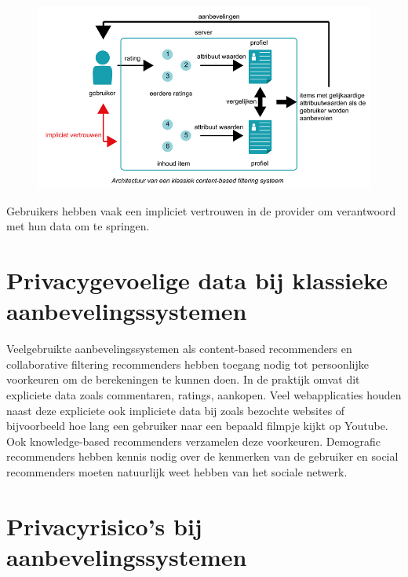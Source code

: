 \begin{figure}[htpb]   
    \label{Figuur::randomisatie}      
  \begin{center}    
 \includegraphics[scale=0.5]{fig/klassiek_systeem}    
  \end{center}   
   
   \end{figure}
Gebruikers hebben vaak een impliciet vertrouwen in de provider om verantwoord met hun data om te springen. 
\pagebreak
\section{Privacygevoelige data bij klassieke aanbevelingssystemen}
Veelgebruikte aanbevelingssystemen als content-based recommenders en collaborative filtering recommenders hebben toegang nodig tot persoonlijke voorkeuren om de berekeningen te kunnen doen. In de praktijk omvat dit expliciete data zoals commentaren, ratings, aankopen. Veel webapplicaties houden naast deze expliciete ook impliciete data bij zoals bezochte websites of bijvoorbeeld hoe lang een gebruiker naar een bepaald filmpje kijkt op Youtube. Ook knowledge-based recommenders verzamelen deze voorkeuren. Demografic recommenders hebben kennis nodig over de kenmerken van de gebruiker en social recommenders moeten natuurlijk weet hebben van het sociale netwerk.
\section{Privacyrisico's bij aanbevelingssystemen}
\label{sec:risicos}
